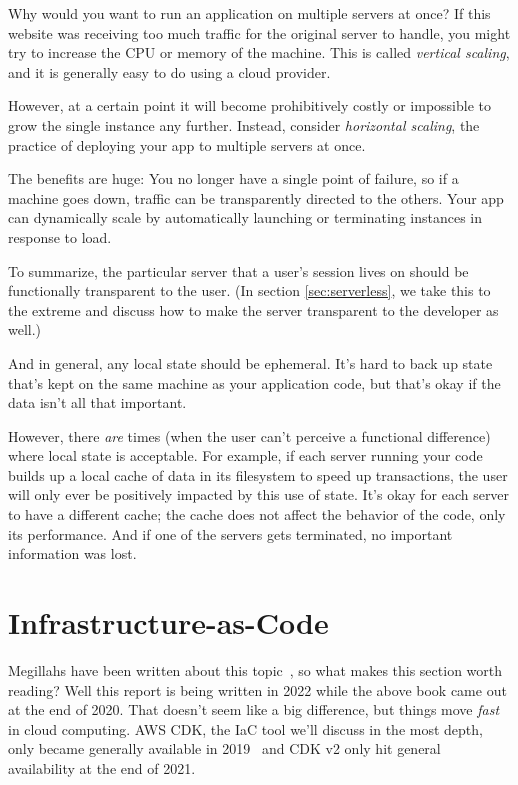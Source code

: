 \documentclass{article}
\newcommand{\infobox}[2]{
  \begin{tcolorbox}[width=\textwidth,colback={white},title={\strut\textbf{#1}},colbacktitle=blue!15,coltitle=black,boxrule=0.2pt,parbox=false]
    #2
  \end{tcolorbox}
}
\newcommand{\noterm}[1]{\textit{#1}}
\newcommand{\term}[1]{\noterm{#1}\index{#1}}
\begin{document}
\infobox{Horizontal scaling}{
  Why would you want to run an application on multiple servers at once?
  If this website was receiving too much traffic for the original server to handle, you might try to increase the CPU or memory of the machine.
  This is called \term{vertical scaling}, and it is generally easy to do using a cloud provider.

  However, at a certain point it will become prohibitively costly or impossible to grow the single instance any further.
  Instead, consider \term{horizontal scaling}, the practice of deploying your app to multiple servers at once.

  The benefits are huge:
  You no longer have a single point of failure, so if a machine goes down, traffic can be transparently directed to the others.
  Your app can dynamically scale by automatically launching or terminating instances in response to load.
}

To summarize, the particular server that a user's session lives on should be functionally transparent to the user.
(In section \ref{sec:serverless}, we take this to the extreme and discuss how to make the server transparent to the developer as well.)

And in general, any local state should be ephemeral.
It's hard to back up state that's kept on the same machine as your application code, but that's okay if the data isn't all that important.

However, there \textit{are} times (when the user can't perceive a functional difference) where local state is acceptable.
For example, if each server running your code builds up a local cache of data in its filesystem to speed up transactions, the user will only ever be positively impacted by this use of state.
It's okay for each server to have a different cache; the cache does not affect the behavior of the code, only its performance.
And if one of the servers gets terminated, no important information was lost.

\section{Infrastructure-as-Code}
\label{IAC}

Megillahs have been written about this topic~\cite{iac-book}, so what makes this section worth reading?
Well this report is being written in 2022 while the above book came out at the end of 2020.
That doesn't seem like a big difference, but things move \textit{fast} in cloud computing.
AWS CDK, the IaC tool we'll discuss in the most depth, only became generally available in 2019~\cite{cdk-1} and CDK v2 only hit general availability at the end of 2021.~\cite{cdk-2}
\end{document}
